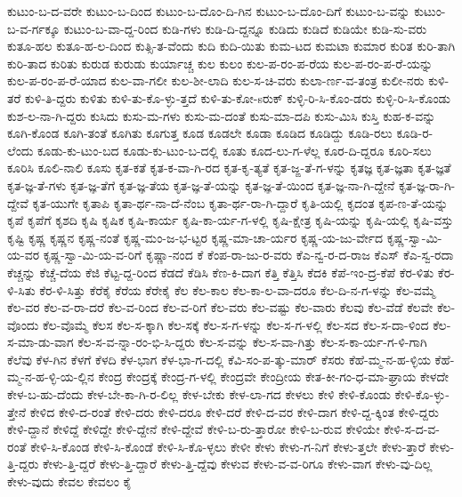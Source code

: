 {ಕುಟುಂ-ಬ-ದ-ವರೇ
ಕುಟುಂ-ಬ-ದಿಂದ
ಕುಟುಂ-ಬ-ದೊಂ-ದಿ-ಗಿನ
ಕುಟುಂ-ಬ-ದೊಂ-ದಿಗೆ
ಕುಟುಂ-ಬ-ವನ್ನು
ಕುಟುಂ-ಬ-ವ-ರ್ಗಕ್ಕೂ
ಕುಟುಂ-ಬ-ವಾ-ದ್ದ-ರಿಂದ
ಕುಡಿ-ಗಳು
ಕುಡಿ-ದಿ-ದ್ದನ್ನೂ
ಕುಡಿದು
ಕುಡಿದೆ
ಕುಡಿಯೇ
ಕುಡಿ-ಸು-ವರು
ಕುತೂ-ಹಲ
ಕುತೂ-ಹ-ಲ-ದಿಂದ
ಕುತ್ಸಿ-ತ-ವೆಂದು
ಕುದಿ
ಕುದಿ-ಯಿತು
ಕುಮ-ಟದ
ಕುಮಟಾ
ಕುಮಾರ
ಕುರಿತ
ಕುರಿ-ತಾಗಿ
ಕುರಿ-ತಾದ
ಕುರಿತು
ಕುರುಡ
ಕುರುಡು
ಕುರ್ಯಾಚ್ಚ
ಕುಲ
ಕುಲಂ
ಕುಲ-ಪ-ರಂ-ಪ-ರೆಯ
ಕುಲ-ಪ-ರಂ-ಪ-ರೆ-ಯನ್ನು
ಕುಲ-ಪ-ರಂ-ಪ-ರೆ-ಯಾದ
ಕುಲ-ವಾ-ಗಲೀ
ಕುಲ-ಶೀ-ಲಾದಿ
ಕುಲ-ಸ-ಚಿ-ವರು
ಕುಲಾ-ರ್ಣ-ವ-ತಂತ್ರ
ಕುಲೀ-ನರು
ಕುಳಿ-ತರೆ
ಕುಳಿ-ತಿ-ದ್ದರು
ಕುಳಿತು
ಕುಳಿ-ತು-ಕೊ-ಳ್ಳು-ತ್ತದೆ
ಕುಳಿ-ತು-ಕೋ-sರುಕ್
ಕುಳ್ಳಿ-ರಿ-ಸಿ-ಕೊಂ-ಡರು
ಕುಳ್ಳಿ-ರಿ-ಸಿ-ಕೊಂಡು
ಕುಶ-ಲ-ನಾ-ಗಿ-ದ್ದರು
ಕುಸಿದು
ಕುಸು-ಮ-ಗಳು
ಕುಸು-ಮ-ದಂತೆ
ಕುಸು-ಮಾ-ದಪಿ
ಕುಸು-ಮಿಸಿ
ಕುಸ್ತಿ
ಕುಹ-ಕ-ವನ್ನು
ಕೂಗಿ-ಕೊಂಡ
ಕೂಗಿ-ತಂತೆ
ಕೂಗಿತು
ಕೂಗುತ್ತ
ಕೂಡ
ಕೂಡಲೇ
ಕೂಡಾ
ಕೂಡಿದ
ಕೂಡಿದ್ದು
ಕೂಡಿ-ರಲು
ಕೂಡಿ-ರ-ಲೆಂದು
ಕೂಡು-ಕು-ಟುಂ-ಬದ
ಕೂಡು-ಕು-ಟುಂ-ಬ-ದಲ್ಲಿ
ಕೂತು
ಕೂದ-ಲು-ಗ-ಳೆಲ್ಲ
ಕೂರ-ದಿ-ದ್ದರೂ
ಕೂರಿ-ಸಲು
ಕೂರಿಸಿ
ಕೂಲಿ-ನಾಲಿ
ಕೂಸು
ಕೃತ-ಕತೆ
ಕೃತ-ಕ-ವಾ-ಗಿ-ರದ
ಕೃತ-ಕೃ-ತ್ಯತೆ
ಕೃತ-ಜ್ಙ-ತೆ-ಗ-ಳನ್ನು
ಕೃತಜ್ಞ
ಕೃತ-ಜ್ಞತಾ
ಕೃತ-ಜ್ಞತೆ
ಕೃತ-ಜ್ಞ-ತೆ-ಗಳು
ಕೃತ-ಜ್ಞ-ತೆಗೆ
ಕೃತ-ಜ್ಞ-ತೆಯ
ಕೃತ-ಜ್ಞ-ತೆ-ಯನ್ನು
ಕೃತ-ಜ್ಞ-ತೆ-ಯಿಂದ
ಕೃತ-ಜ್ಞ-ನಾ-ಗಿ-ದ್ದೇನೆ
ಕೃತ-ಜ್ಞ-ರಾ-ಗಿ-ದ್ದೇವೆ
ಕೃತ-ಯುಗೇ
ಕೃತಾಪಿ
ಕೃತಾ-ರ್ಥ-ನಾ-ದೆ-ನೆಂಬ
ಕೃತಾ-ರ್ಥ-ರಾ-ಗಿ-ದ್ದಾರೆ
ಕೃತಿ-ಯಲ್ಲಿ
ಕೃದಂತ
ಕೃಪ-ಣ-ತೆ-ಯನ್ನು
ಕೃಪೆ
ಕೃಪೆಗೆ
ಕೃಶದಿ
ಕೃಷಿ
ಕೃಷಿಕ
ಕೃಷಿ-ಕಾರ್ಯ
ಕೃಷಿ-ಕಾ-ರ್ಯ-ಗ-ಳಲ್ಲಿ
ಕೃಷಿ-ಕ್ಷೇತ್ರ
ಕೃಷಿ-ಯನ್ನು
ಕೃಷಿ-ಯಲ್ಲಿ
ಕೃಷಿ-ವಸ್ತು
ಕೃಷ್ಟಿ
ಕೃಷ್ಣ
ಕೃಷ್ಣನ
ಕೃಷ್ಣ-ನಂತೆ
ಕೃಷ್ಣ-ಮಂ-ಜ-ಭ-ಟ್ಟರ
ಕೃಷ್ಣ-ಮಾ-ಚಾ-ರ್ಯರ
ಕೃಷ್ಣ-ಯ-ಜು-ರ್ವೇದ
ಕೃಷ್ಣ-ಸ್ವಾ-ಮಿ-ಯ-ವರ
ಕೃಷ್ಣ-ಸ್ವಾ-ಮಿ-ಯ-ವ-ರಿಗೆ
ಕೃಷ್ಣಾ-ನಂದ
ಕೆ
ಕೆಂಪ-ರಾ-ಜು-ರ-ವರು
ಕೆಎ-ನ್ವ-ರ-ದ-ರಾಜ
ಕೆಎಸ್
ಕೆಎ-ಸ್ವ-ರದಾ
ಕೆಚ್ಚನ್ನು
ಕೆಚ್ಚೆ-ದೆಯ
ಕೆಜಿ
ಕೆಟ್ಟ-ದ್ದ-ರಿಂದ
ಕೆಡದೆ
ಕೆಡಿಸಿ
ಕೆಣ-ಕಿ-ದಾಗ
ಕೆತ್ತಿ
ಕೆತ್ತಿಸಿ
ಕೆದಕಿ
ಕೆಪೆ-ಇಂ-ದ್ರ-ಕೆಪೆ
ಕೆರ-ಳಿತು
ಕೆರ-ಳಿ-ಸಿತು
ಕೆರ-ಳಿ-ಸಿತ್ತು
ಕೆರೆಕೈ
ಕೆರೆಯ
ಕೆರೇಕೈ
ಕೆಲ
ಕೆಲ-ಕಾಲ
ಕೆಲ-ಕಾ-ಲ-ವಾ-ದರೂ
ಕೆಲ-ದಿ-ನ-ಗ-ಳನ್ನು
ಕೆಲ-ವಮ್ಮೆ
ಕೆಲ-ವರ
ಕೆಲ-ವ-ರಾ-ದರೆ
ಕೆಲ-ವ-ರಿಂದ
ಕೆಲ-ವ-ರಿಗೆ
ಕೆಲ-ವರು
ಕೆಲ-ವಷ್ಟು
ಕೆಲ-ವಾರು
ಕೆಲವು
ಕೆಲ-ವೆಡೆ
ಕೆಲವೇ
ಕೆಲ-ವೊಂದು
ಕೆಲ-ವೊಮ್ಮೆ
ಕೆಲಸ
ಕೆಲ-ಸ-ಕ್ಕಾಗಿ
ಕೆಲ-ಸಕ್ಕೆ
ಕೆಲ-ಸ-ಗ-ಳನ್ನು
ಕೆಲ-ಸ-ಗ-ಳಲ್ಲಿ
ಕೆಲ-ಸದ
ಕೆಲ-ಸ-ದಾ-ಳಿಂದ
ಕೆಲ-ಸ-ಮಾ-ಡು-ವಾಗ
ಕೆಲ-ಸ-ವ-ನ್ನಾ-ರಂ-ಭಿ-ಸಿ-ದ್ದರು
ಕೆಲ-ಸ-ವನ್ನು
ಕೆಲ-ಸ-ವಾ-ಗಿತ್ತು
ಕೆಲ-ಸ-ಕಾ-ರ್ಯ-ಗ-ಳಿ-ಗಾಗಿ
ಕೆಲೆವು
ಕೆಳ-ಗಿನ
ಕೆಳಗೆ
ಕೆಳದಿ
ಕೆಳ-ಭಾಗ
ಕೆಳ-ಭಾ-ಗ-ದಲ್ಲಿ
ಕೆವಿ-ಸಂ-ಪ-ತ್ಕು-ಮಾರ್
ಕೆಸರು
ಕೆಹೆ-ಮ್ಮ-ನ-ಹ-ಳ್ಳಿಯ
ಕೆಹೆ-ಮ್ಮ-ನ-ಹ-ಳ್ಳಿ-ಯ-ಲ್ಲಿನ
ಕೇಂದ್ರ
ಕೇಂದ್ರಕ್ಕೆ
ಕೇಂದ್ರ-ಗ-ಳಲ್ಲಿ
ಕೇಂದ್ರವೇ
ಕೇಂದ್ರೀಯ
ಕೇತ-ಕೀ-ಗಂ-ಧ-ಮಾ-ಘ್ರಾಯ
ಕೇಳದೇ
ಕೇಳ-ಬ-ಹು-ದೆಂದು
ಕೇಳ-ಬೇ-ಕಾ-ಗಿ-ರ-ಲಿಲ್ಲ
ಕೇಳ-ಬೇಕು
ಕೇಳ-ಲಾ-ಗದ
ಕೇಳಲು
ಕೇಳಿ
ಕೇಳಿ-ಕೊಂಡು
ಕೇಳಿ-ಕೊ-ಳ್ಳು-ತ್ತೇನೆ
ಕೇಳಿದ
ಕೇಳಿ-ದ-ರಂತೆ
ಕೇಳಿ-ದರು
ಕೇಳಿ-ದರೂ
ಕೇಳಿ-ದರೆ
ಕೇಳಿ-ದ-ವರ
ಕೇಳಿ-ದಾಗ
ಕೇಳಿ-ದ್ದ-ಕ್ಕಿಂತ
ಕೇಳಿ-ದ್ದರು
ಕೇಳಿ-ದ್ದಾನೆ
ಕೇಳಿದ್ದೆ
ಕೇಳಿದ್ದೇ
ಕೇಳಿ-ದ್ದೇನೆ
ಕೇಳಿ-ದ್ದೇವೆ
ಕೇಳಿ-ಬ-ರು-ತ್ತಾರೋ
ಕೇಳಿ-ಬ-ರುವ
ಕೇಳಿಯೇ
ಕೇಳಿ-ಸ-ದ-ವ-ರಂತೆ
ಕೇಳಿ-ಸಿ-ಕೊಂಡ
ಕೇಳಿ-ಸಿ-ಕೊಂಡೆ
ಕೇಳಿ-ಸಿ-ಕೊ-ಳ್ಳಲು
ಕೇಳೀ
ಕೇಳು
ಕೇಳು-ಗ-ನಿಗೆ
ಕೇಳು-ತ್ತಲೇ
ಕೇಳು-ತ್ತಾರೆ
ಕೇಳು-ತ್ತಿ-ದ್ದರು
ಕೇಳು-ತ್ತಿ-ದ್ದರೆ
ಕೇಳು-ತ್ತಿ-ದ್ದಾರೆ
ಕೇಳು-ತ್ತಿ-ದ್ದೆವು
ಕೇಳುವ
ಕೇಳು-ವ-ವ-ರಿಗೂ
ಕೇಳು-ವಾಗ
ಕೇಳು-ವು-ದಿಲ್ಲ
ಕೇಳು-ವುದು
ಕೇವಲ
ಕೇವಲಂ
ಕೈ
}
